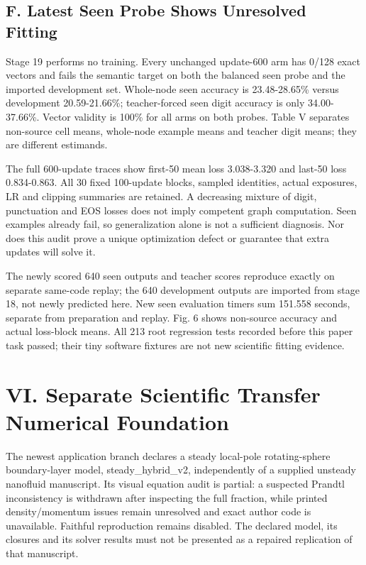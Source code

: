 \documentclass[10pt,letterpaper,twocolumn]{article}
\begin{document}
\subsection*{F. Latest Seen Probe Shows Unresolved Fitting}
Stage 19 performs no training. Every unchanged update-600 arm has 0/\allowbreak{}128 exact vectors and fails the semantic target on both the balanced seen probe and the imported development set. Whole-node seen accuracy is 23.48-28.65\% versus development 20.59-21.66\%; teacher-forced seen digit accuracy is only 34.00-37.66\%. Vector validity is 100\% for all arms on both probes. Table V separates non-source cell means, whole-node example means and teacher digit means; they are different estimands.

The full 600-update traces show first-50 mean loss 3.038-3.320 and last-50 loss 0.834-0.863. All 30 fixed 100-update blocks, sampled identities, actual exposures, LR and clipping summaries are retained. A decreasing mixture of digit, punctuation and EOS losses does not imply competent graph computation. Seen examples already fail, so generalization alone is not a sufficient diagnosis. Nor does this audit prove a unique optimization defect or guarantee that extra updates will solve it.

The newly scored 640 seen outputs and teacher scores reproduce exactly on separate same-code replay; the 640 development outputs are imported from stage 18, not newly predicted here. New seen evaluation timers sum 151.558 seconds, separate from preparation and replay. Fig. 6 shows non-source accuracy and actual loss-block means. All 213 root regression tests recorded before this paper task passed; their tiny software fixtures are not new scientific fitting evidence.

\section*{VI. Separate Scientific Transfer Numerical Foundation}
The newest application branch declares a steady local-pole rotating-sphere boundary-layer model, steady\_\allowbreak{}hybrid\_\allowbreak{}v2, independently of a supplied unsteady nanofluid manuscript. Its visual equation audit is partial: a suspected Prandtl inconsistency is withdrawn after inspecting the full fraction, while printed density/\allowbreak{}momentum issues remain unresolved and exact author code is unavailable. Faithful reproduction remains disabled. The declared model, its closures and its solver results must not be presented as a repaired replication of that manuscript.
\end{document}
